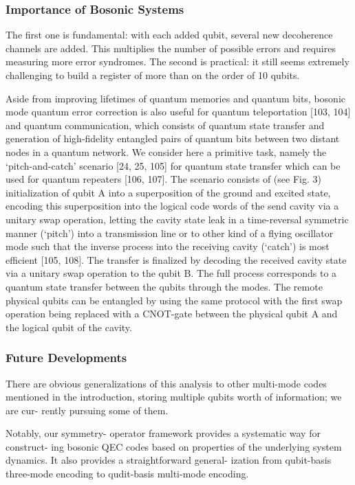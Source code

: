\documentclass[12]{amsart}
\newcommand\0{\mathbf{0}}
\newcommand\<{\langle}
\renewcommand\>{\rangle}
\begin{document}
\subsubsection{Importance of Bosonic Systems}

The first one is fundamental: with each added qubit, several new decoherence channels are added. This multiplies the number of possible errors and requires measuring more error syndromes. The second is practical: it still seems extremely challenging to build a register of more than on the order of 10 qubits.

Aside from improving lifetimes of quantum memories and quantum bits, bosonic mode quantum error correction is also useful for quantum teleportation [103, 104] and quantum communication, which consists of quantum state transfer and generation of high-fidelity entangled pairs of quantum bits between two distant nodes in a quantum network. We consider here a primitive task, namely the
‘pitch-and-catch’ scenario [24, 25, 105] for quantum state transfer which can be used for quantum repeaters [106, 107]. The scenario consists of (see Fig. 3) initialization of qubit A into a superposition of the ground and excited state, encoding this superposition into the logical code words of the send cavity via a unitary swap operation, letting the cavity state leak in a time-reversal symmetric manner (‘pitch’) into a transmission line or to other kind of a flying oscillator mode such that the inverse process into the receiving cavity (‘catch’) is most efficient [105, 108]. The transfer is finalized by decoding the received cavity state via a unitary swap operation to the qubit B. The full process corresponds to a quantum state transfer between the qubits through the modes. The remote physical qubits can be entangled by using the same protocol with the first swap operation being replaced with a CNOT-gate between the physical qubit A and the logical qubit of the cavity.

\subsubsection{Future Developments}

There are obvious generalizations of this analysis to other multi-mode codes mentioned in the introduction, storing multiple qubits worth of information; we are cur- rently pursuing some of them.

Notably, our symmetry- operator framework provides a systematic way for construct- ing bosonic QEC codes based on properties of the underlying system dynamics. It also provides a straightforward general- ization from qubit-basis three-mode encoding to qudit-basis multi-mode encoding.

\nocite{*}


\end{document}
